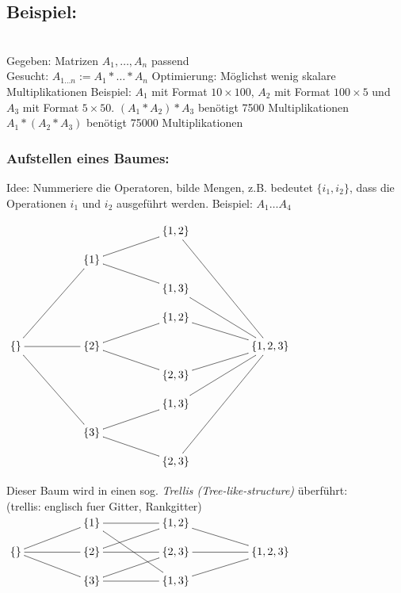 \documentclass[a4paper,twoside,DIV15,BCOR12mm]{scrbook}
\begin{document}
\subsection{Beispiel:}\ \\
Gegeben: Matrizen $A_1,\ldots,A_n$ passend\\
Gesucht: $A_{1\ldots n} := A_1 \ast \ldots \ast A_n$
Optimierung: Möglichst wenig skalare Multiplikationen
Beispiel: $A_1$ mit Format $10\times 100$, $A_2$ mit Format $100\times 5$ und $A_3$ mit Format $5\times 50$.
$(A_1 \ast A_2)\ast A_3$ benötigt 7500 Multiplikationen
$A_1 \ast (A_2 \ast A_3)$ benötigt 75000 Multiplikationen
\subsubsection{Aufstellen eines Baumes:}
Idee: Nummeriere die Operatoren, bilde Mengen, z.B. bedeutet $\{i_1, i_2\}$, dass die Operationen $i_1$ und $i_2$ ausgeführt werden.
Beispiel: $A_1\ldots A_4$
\begin{center}
$\begin{xy}
		\xymatrix @R=10pt @C=50pt {
	  	*{} & *{} & \{1,2\} \ar@{-}[rdddd]& *{}\\ 
	  	*{} & \{1\} \ar@{-}[ru]\ar@{-}[rd]& *{} & *{} \\ 
	  	*{} & *{} & \{1,3\} \ar@{-}[rdd]& *{} \\
	  	*{} & *{} & \{1,2\} \ar@{-}[rd]& *{} \\
	  	\{\} \ar@{-}[ruuu]\ar@{-}[r]\ar@{-}[rddd]& \{2\} \ar@{-}[ru]\ar@{-}[rd]& *{} & \{1,2,3\} \\
	  	*{} & *{} & \{2,3\} \ar@{-}[ru]& *{} \\
	  	*{} & *{} & \{1,3\} \ar@{-}[ruu]& *{} \\
	  	*{} & \{3\} \ar@{-}[ru]\ar@{-}[rd]& *{} & *{} \\	  	
	  	*{} & *{} & \{2,3\} \ar@{-}[ruuuu]& *{} \\	  	
		}
\end{xy}$
\end{center}

Dieser Baum wird in einen sog. \emph{Trellis (Tree-like-structure)} überführt:\\
(trellis: englisch fuer Gitter, Rankgitter)\\
$\begin{xy}
		\xymatrix @R=10pt @C=50pt {
	  	*{} & \{1\} \ar@{-}[r]\ar@{-}[rdd]& \{1,2\}\ar@{-}[rd] & *{} \\ 
	  	\{\} \ar@{-}[ru]\ar@{-}[r]\ar@{-}[rd]& \{2\} \ar@{-}[ru]\ar@{-}[r]& \{2,3\}\ar@{-}[r] & \{1,2,3\} \\
	  	*{} & \{3\} \ar@{-}[r]\ar@{-}[ru]& \{1,3\}\ar@{-}[ru] & *{} \\	  	
		}
\end{xy}$
\end{document}
